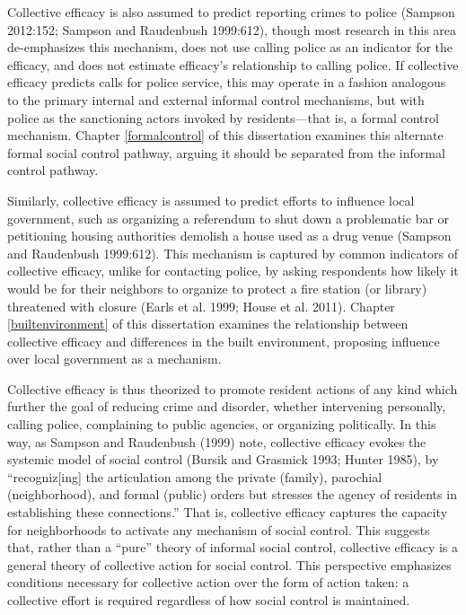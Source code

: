 \documentclass [11pt, proquest] {uwthesis}[2015/03/03]
\begin{document}
Collective efficacy is also assumed to predict reporting crimes to police (Sampson 2012:152; Sampson and Raudenbush 1999:612), though most research in this area de-emphasizes this mechanism, does not use calling police as an indicator for the efficacy, and does not estimate efficacy's relationship to calling police. If collective efficacy predicts calls for police service, this may operate in a fashion analogous to the primary internal and external informal control mechanisms, but with police as the sanctioning actors invoked by residents---that is, a formal control mechanism. Chapter \ref{formalcontrol} of this dissertation examines this alternate formal social control pathway, arguing it should be separated from the informal control pathway.

Similarly, collective efficacy is assumed to predict efforts to influence local government, such as organizing a referendum to shut down a problematic bar or petitioning housing authorities demolish a house used as a drug venue (Sampson and Raudenbush 1999:612). This mechanism is captured by common indicators of collective efficacy, unlike for contacting police, by asking respondents how likely it would be for their neighbors to organize to protect a fire station (or library) threatened with closure (Earls et al. 1999; House et al. 2011). Chapter \ref{builtenvironment} of this dissertation examines the relationship between collective efficacy and differences in the built environment, proposing influence over local government as a mechanism.

Collective efficacy is thus theorized to promote resident actions of any kind which further the goal of reducing crime and disorder, whether intervening personally, calling police, complaining to public agencies, or organizing politically. In this way, as Sampson and Raudenbush (1999) note, collective efficacy evokes the systemic model of social control (Bursik and Grasmick 1993; Hunter 1985), by ``recogniz{[}ing{]} the articulation among the private (family), parochial (neighborhood), and formal (public) orders but stresses the agency of residents in establishing these connections.'' That is, collective efficacy captures the capacity for neighborhoods to activate any mechanism of social control. This suggests that, rather than a ``pure'' theory of informal social control, collective efficacy is a general theory of collective action for social control. This perspective emphasizes conditions necessary for collective action over the form of action taken: a collective effort is required regardless of how social control is maintained.
\end{document}
